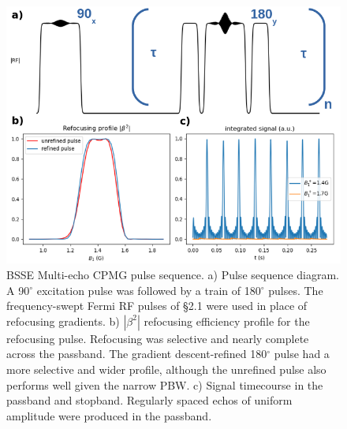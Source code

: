\begin{figure}[h]
\centering
\includegraphics[width=1\textwidth]{figures/cpmg_oneb1_refined_processed.png}
\caption{BSSE Multi-echo CPMG pulse sequence. 
a) Pulse sequence diagram. A 90$^\circ$ excitation pulse was followed by a train of 180$^\circ$ pulses. 
The frequency-swept Fermi RF pulses of \S 2.1 were used in place of refocusing gradients. 
b) $|\beta^2|$ refocusing efficiency profile for the refocusing pulse. 
Refocusing was selective and nearly complete across the passband. 
The gradient descent-refined 180$^\circ$ pulse had a more selective and wider profile, 
although the unrefined pulse also performs well given the narrow PBW. 
c) Signal timecourse in the passband and stopband. 
Regularly spaced echos of uniform amplitude were produced in the passband.}
\label{fig:cpmg}
\end{figure}




